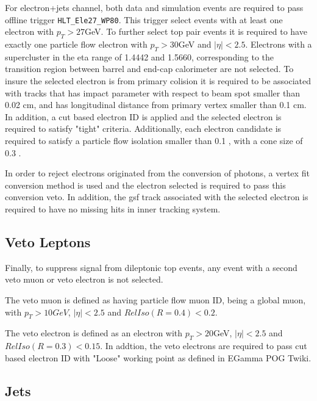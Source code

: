 \documentclass{cmspaperpdf}
\begin{document}
For electron+jets channel, both data and simulation events are required to pass offline trigger \texttt{HLT\_Ele27\_WP80}. This trigger select events with at least one electron with $p_T>27$GeV.  To further select top pair events it is required to have exactly one particle flow electron with $p_T>30$GeV and $|\eta|<2.5$. Electrons with a supercluster in the eta range of 1.4442 and 1.5660, corresponding to the transition region between barrel and end-cap calorimeter are not selected. To insure the selected electron is from primary colision it is required to be associated with tracks that has impact parameter with respect to beam spot smaller than 0.02 cm, and has longitudinal distance from primary vertex smaller than 0.1 cm. In addition, a cut based electron ID is applied and the selected electron is required to satisfy "tight" criteria\cite{electron_cut_based_ID}. Additionally, each electron candidate is required to satisfy a particle flow isolation smaller than 0.1 , with a cone size of 0.3 . 

In order to reject electrons originated from the conversion of photons, a vertex fit conversion method is used and the electron selected is required to pass this conversion veto. In addition, the gsf track associated with the selected electron is required to have no missing hits in inner tracking system.


\subsection{Veto Leptons}
Finally, to suppress signal from dileptonic top events, any event with a second veto muon or veto electron is not selected.

The veto muon is defined as having particle flow muon ID, being a global muon, with $p_T>10 GeV$, $|\eta|<2.5$ and $RelIso(R=0.4)<0.2$.

The veto electron is defined as an electron with $p_T>20$GeV, $|\eta|<2.5$ and $RelIso(R=0.3)<0.15$. In addtion, the veto electrons are required to pass cut based electron ID with "Loose" working point as defined in EGamma POG Twiki\cite{electron_cut_based_ID}.

\subsection{Jets}
\end{document}
